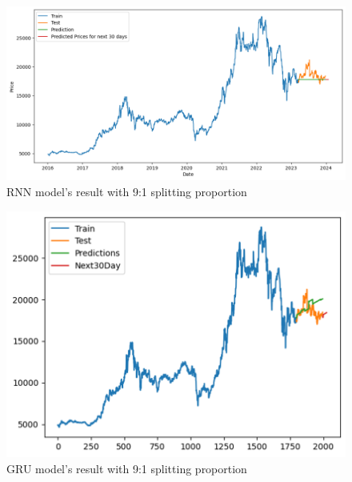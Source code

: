 \documentclass{ieeeojies}
\begin{document}
\begin{figure}[H]
  \centering
  \begin{minipage}{0.8\linewidth}
    \centering
    \includegraphics[width=\linewidth]{bibliography/SARIMA_MBB91.png}
    \caption{RNN model's result with 9:1 splitting proportion}
    \label{fig19}
  \end{minipage}
\end{figure}
\begin{figure}[H]
  \centering
  \begin{minipage}{0.8\linewidth}
    \centering
    \includegraphics[width=\linewidth]{bibliography/DLM_MBB91.png}
    \caption{GRU model's result with 9:1 splitting proportion}
    \label{fig20}
  \end{minipage}
\end{figure}
\end{document}
